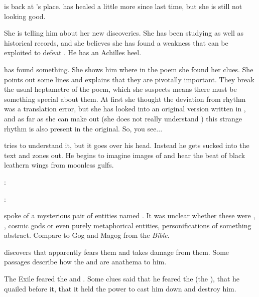 
\Teshrial is back at \Urizeth's place.
\Urizeth has healed a little more since last time, but she is still not looking good.

She is telling him about her new discoveries.  
She has been studying \WanderersInDarknessEmph as well as historical records, and she believes she has found a weakness that can be exploited to defeat \Ishnaruchaefir. 
He has an Achilles heel. 

\Urizeth has found something.
She shows him where in the poem she found her clues.
She points out some lines and explains that they are pivotally important. 
They break the usual heptametre of the poem, which she suspects means there must be something special about them.
At first she thought the deviation from rhythm was a translation error, but she has looked into an original version written in \TrueDraconic, and as far as she can make out (she does not really understand \TrueDraconic) this strange rhythm is also present in the original.
So, you see...

\Teshrial tries to understand it, but it goes over his head.
Instead he gets sucked into the text and zones out. 
He begins to imagine images of \dragons and hear the beat of black leathern wings from moonless gulfs.

\Urizeth:

\Teshrial:




\begin{comment}
  \section{\Zaz and \Urzaz}
\end{comment}
\WanderersInDarknessEmph spoke of a mysterious pair of entities named . 
It was unclear whether these were \dragons, \xss, cosmic gods or even purely metaphorical entities, personifications of something abstract.
Compare to Gog and Magog from the \emph{Bible}.

\Urizeth discovers that \Ishnaruchaefir apparently fears them and takes damage from them.  
Some \WanderersInDarknessEmph passages describe how the \Zaz and \Urzaz are anathema to him.

The Exile feared the  and .
Some clues said that he feared the \malgryph (the ), that he quailed before it, that it held the power to cast him down and destroy him.

